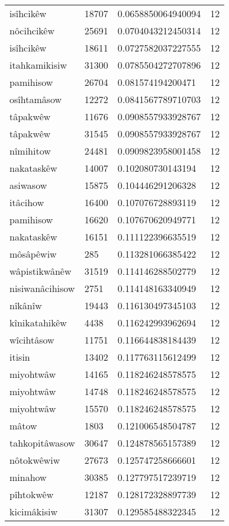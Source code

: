 \begin{longtable}{llll}
isîhcikêw & 18707 & 0.0658850064940094 & 12 \\
nôcihcikêw & 25691 & 0.0704043212450314 & 12 \\
isîhcikêw & 18611 & 0.0727582037227555 & 12 \\
itahkamikisiw & 31300 & 0.0785504272707896 & 12 \\
pamihisow & 26704 & 0.081574194200471 & 12 \\
osîhtamâsow & 12272 & 0.0841567789710703 & 12 \\
tâpakwêw & 11676 & 0.0908557933928767 & 12 \\
tâpakwêw & 31545 & 0.0908557933928767 & 12 \\
nîmihitow & 24481 & 0.0909823958001458 & 12 \\
nakataskêw & 14007 & 0.102080730143194 & 12 \\
asiwasow & 15875 & 0.104446291206328 & 12 \\
itâcihow & 16400 & 0.107076728893119 & 12 \\
pamihisow & 16620 & 0.107670620949771 & 12 \\
nakataskêw & 16151 & 0.111122396635519 & 12 \\
môsâpêwiw & 285 & 0.113281066385422 & 12 \\
wâpistikwânêw & 31519 & 0.114146288502779 & 12 \\
nisiwanâcihisow & 2751 & 0.114148163340949 & 12 \\
nîkânîw & 19443 & 0.116130497345103 & 12 \\
kînikatahikêw & 4438 & 0.116242993962694 & 12 \\
wîcihtâsow & 11751 & 0.116644838184439 & 12 \\
itisin & 13402 & 0.117763115612499 & 12 \\
miyohtwâw & 14165 & 0.118246248578575 & 12 \\
miyohtwâw & 14748 & 0.118246248578575 & 12 \\
miyohtwâw & 15570 & 0.118246248578575 & 12 \\
mâtow & 1803 & 0.121006548504787 & 12 \\
tahkopitâwasow & 30647 & 0.124878565157389 & 12 \\
nôtokwêwiw & 27673 & 0.125747258666601 & 12 \\
minahow & 30385 & 0.127797517239719 & 12 \\
pîhtokwêw & 12187 & 0.128172328897739 & 12 \\
kicimâkisiw & 31307 & 0.129585488322345 & 12 \\

\end{longtable}
